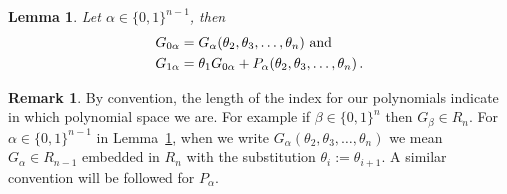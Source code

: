 \documentclass[11pt]{amsart}
\newtheorem{lemma}[theorem]{Lemma}
\theoremstyle{definition}
\newtheorem{remark}[theorem]{Remark}
\numberwithin{equation}{section}
\begin{document}
\begin{lemma}\label{lem:LT}
 Let $\alpha \in \{0,1\}^{n-1}$, then
\begin{align}
G_{0\alpha} &= G_\alpha(\theta_2, \theta_3, \ldots, \theta_n) \hbox{ and }\label{eq:0start}\\
G_{1\alpha} &= \theta_1 G_{0\alpha} + P_{\alpha}(\theta_2, \theta_3, \ldots, \theta_n)\,. \label{eq:1start}
\end{align}
\end{lemma}

\begin{remark}\label{rem:shift}
By convention, the length of the index for our polynomials indicate in which polynomial space we are.
For example if $\beta   \in \{0,1\}^{n}$ then $G_\beta\in R_n$. For $\alpha \in \{0,1\}^{n-1}$  in Lemma~\ref{lem:LT}, when we write
$G_\alpha(\theta_2, \theta_3, \ldots, \theta_n)$ we mean $G_\alpha\in  R_{n-1}$
embedded in $R_n$ with the substitution
$\theta_i:=\theta_{i+1}$. A similar convention will be followed for $P_\alpha$.
\end{remark}
\end{document}
